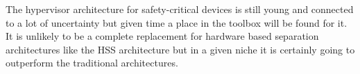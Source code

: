The hypervisor architecture for safety-critical devices is still young and connected to a lot of uncertainty but given time a place in the toolbox will be found for it. It is unlikely to be a complete replacement for hardware based separation architectures like the \gls{HSS} architecture but in a given niche it is certainly going to outperform the traditional architectures.


\begin{comment} 
* Mixed criticality has been present for a long time in very complex projects but with increased processing power and user demands it makes more and more sense in smaller devices.
* For this reason and because of efforts in some industries to save SWaP alternate solutions to the mixed criticality problem have been seeing some adoption.
* One of these is the hypervisor that this thesis set out to compare more in-depth.
* From that comparison the crucial differences and their effects emerged
* [Refer to conclusion from that section]
* Based on this some reference project have been proposed that can be categorized into these [] categories.
* Ultimately it can be said the hypervisor has a couple of very promising places of application.
* So it can be said the best scenarios for the hypervisor architecture are the ones where this happens: []
* The advent of microkernel based safety hypervisors along with the maturation in virtualization technology, especially in the embedded space provides an avenue to deal with the problems that arise from mixed criticality.
\end{comment}
